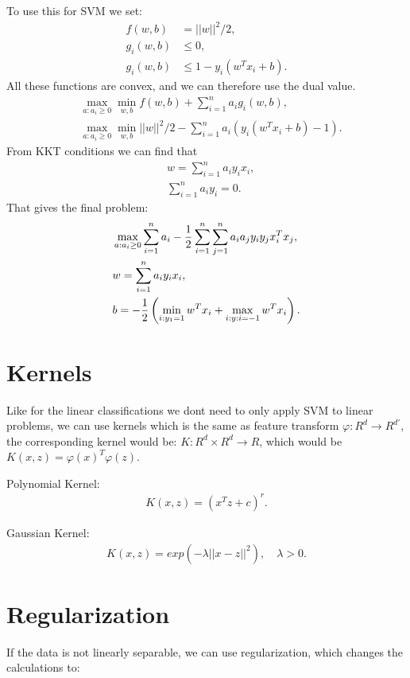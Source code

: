 \documentclass[a4paper,oneside,article]{memoir}
\begin{document}
To use this for SVM we set: 
\begin{align*}
    f(w, b) &= ||w||^2/2, \\
    g_i(w, b) &\leq 0, \\
    g_i(w, b) &\leq 1-y_i(w^Tx_i+b). 
\end{align*}
All these functions are convex, and we can therefore use the dual value. 
\begin{align*}
    &\max_{a: a_i \geq 0}\min_{w,b} f(w,b) + \sum_{i=1}^{n}a_ig_i(w,b), \\
    &\max_{a: a_i \geq 0}\min_{w,b} ||w||^2/2 - \sum_{i=1}^{n}a_i(y_i(w^Tx_i+b)-1). 
\end{align*}
From KKT conditions we can find that 
\begin{align*}
    &w = \sum_{i=1}^{n}a_iy_ix_i, \\
    &\sum_{i=1}^{n}a_iy_i = 0. 
\end{align*}
That gives the final problem: 
\begin{align*}
    &\max_{a: a_i \geq 0} \sum_{i=1}^{n}a_i-\frac{1}{2}\sum_{i=1}^{n}\sum_{j=1}^{n}a_ia_jy_iy_jx_i^Tx_j, \\
    &w = \sum_{i=1}^{n}a_iy_ix_i, \\
    &b = -\frac{1}{2}\br{\min_{i:y_1=1}w^Tx_i+\max_{i:y:i=-1}w^Tx_i}. 
\end{align*}

\section{Kernels}
Like for the linear classifications we dont need to only apply SVM to linear problems, 
we can use kernels which is the same as feature transform $φ: R^d \rightarrow R^{d'}$, 
the corresponding kernel would be: $K: R^d \times R^d \rightarrow R$, which would be $K(x,z) = φ(x)^Tφ(z)$. 


Polynomial Kernel: 
\begin{align*}
    K(x,z) = (x^Tz+c)^r.
\end{align*}

Gaussian Kernel: 
\begin{align*}
    K(x,z) = exp(-λ||x-z||^2), \quad λ > 0. 
\end{align*}

\section{Regularization}
If the data is not linearly separable, we can use regularization, 
which changes the calculations to: 
\end{document}
